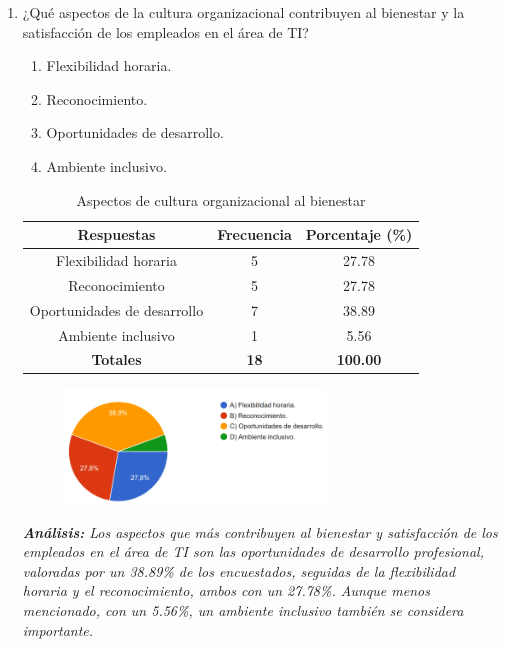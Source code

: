 \documentclass[journal]{IEEEtran}
\begin{document}
\begin{enumerate}
	\item ¿Qué aspectos de la cultura organizacional contribuyen al bienestar y la satisfacción de los empleados en el área de TI?
	\begin{enumerate}
		\item Flexibilidad horaria.
		\item Reconocimiento.
		\item Oportunidades de desarrollo.
		\item Ambiente inclusivo.
	\end{enumerate}
	\begin{table}[H]
	\renewcommand{\arraystretch}{1.3}
	\centering
	\caption{Aspectos de cultura organizacional al bienestar}
	\begin{tabular}{c c c}
		\hline
		\textbf{Respuestas} & \textbf{Frecuencia} & \textbf{Porcentaje (\%)}\\
		\hline
		Flexibilidad horaria & 5 & 27.78\\
		Reconocimiento & 5 & 27.78\\
		Oportunidades de desarrollo & 7 & 38.89\\
		Ambiente inclusivo & 1 & 5.56\\
		\hline
		\textbf{Totales} &\textbf{18}& \textbf{100.00}\\
		\hline
	\end{tabular}
	\end{table}
	\begin{figure}[h]
		\centering
		\includegraphics[width=07cm]{Pregunta21}
	\end{figure}
	\textit{\textbf{Análisis:} Los aspectos que más contribuyen al bienestar y satisfacción de los empleados en el área de TI son las oportunidades de desarrollo profesional, valoradas por un 38.89\% de los encuestados, seguidas de la flexibilidad horaria y el reconocimiento, ambos con un 27.78\%. Aunque menos mencionado, con un 5.56\%, un ambiente inclusivo también se considera importante.}\\
	

\end{enumerate}
\end{document}

